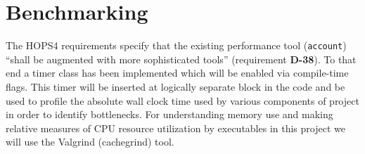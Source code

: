 %
%
\section{Benchmarking}
\label{sec:benchmark}

The HOPS4 requirements specify that the existing performance tool (\texttt{account}) ``shall be augmented with more sophisticated tools'' (requirement \textbf{D-38}).
To that end a timer class has been implemented which will be enabled via compile-time flags.  This timer will be inserted at logically separate block in the code and be 
used to profile the absolute wall clock time used by various components of project in order to identify bottlenecks. 
For understanding memory use and making relative measures of CPU resource utilization by executables in this project we will use the Valgrind (cachegrind) tool.

%
%
